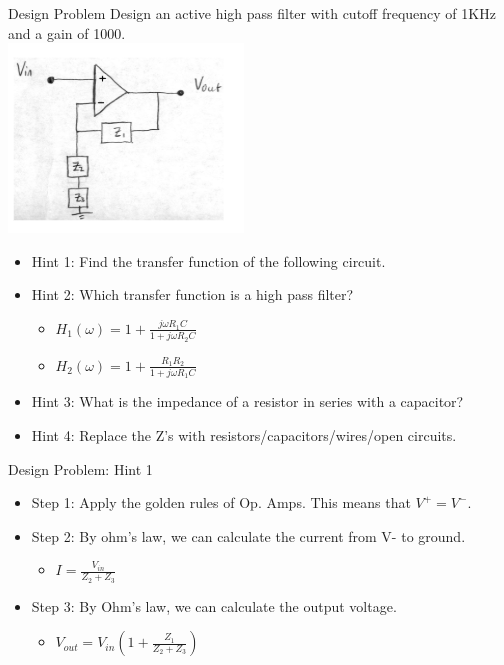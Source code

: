 \documentclass{beamer}
\begin{document}
    \begin{frame}{Design Problem}
        Design an active high pass filter with cutoff frequency of 1KHz and a gain of 1000.\\
        \includegraphics[scale=0.65]{design-problem-summary.png}\\
        \begin{itemize}
            \item Hint 1:  Find the transfer function of the following circuit.
            \item Hint 2: Which transfer function is a high pass filter?
            \begin{itemize}
                \item $H_1(\omega) = 1 + \frac{j\omega R_1C}{1 + j\omega R_2C}$
                \item $H_2(\omega) = 1 + \frac{R_1R_2}{1 + j\omega R_1C}$
            \end{itemize}
            \item Hint 3: What is the impedance of a resistor in series with a capacitor?
            \item Hint 4: Replace the Z’s with resistors/capacitors/wires/open circuits.
        \end{itemize}
    \end{frame}
    \begin{frame}{Design Problem: Hint 1}
        \begin{itemize}
            \item Step 1: Apply the golden rules of Op. Amps. This means that $V^+ = V^-$.
            \item Step 2: By ohm’s law, we can calculate the current from V- to ground.
            \begin{itemize}
                \item $I = \frac{V_{in}}{Z_2 + Z_3}$
            \end{itemize}
            \item Step 3: By Ohm’s law, we can calculate the output voltage.
            \begin{itemize}
                \item $V_{out} = V_{in}(1 + \frac{Z_1}{Z_2 + Z_3})$
            \end{itemize}
        \end{itemize}
    \end{frame}
\end{document}
